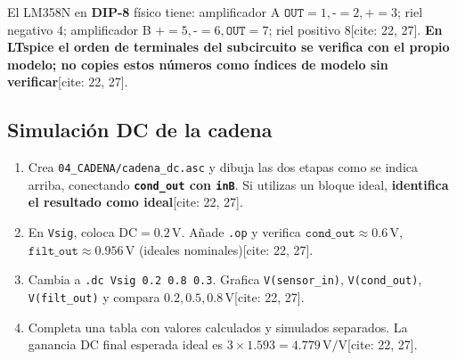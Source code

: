 \documentclass[10pt, a4paper]{article}
\begin{document}
El LM358N en \textbf{DIP-8} físico tiene: amplificador A $\texttt{OUT}=1, \texttt{-}=2, \texttt{+}=3$; riel negativo $4$; amplificador B $\texttt{+}=5, \texttt{-}=6, \texttt{OUT}=7$; riel positivo $8$[cite: 22, 27]. \textbf{En LTspice el orden de terminales del subcircuito se verifica con el propio modelo; no copies estos números como índices de modelo sin verificar}[cite: 22, 27].

\subsection{Simulación DC de la cadena}
\begin{enumerate}[noitemsep, leftmargin=*]
    \item Crea \texttt{04\_CADENA/cadena\_dc.asc} y dibuja las dos etapas como se indica arriba, conectando \textbf{\texttt{cond\_out} con \texttt{inB}}. Si utilizas un bloque ideal, \textbf{identifica el resultado como ideal}[cite: 22, 27].
    \item En \texttt{Vsig}, coloca $\text{DC} = 0.2\,\text{V}$. Añade \texttt{.op} y verifica $\texttt{cond\_out} \approx 0.6\,\text{V}$, $\texttt{filt\_out} \approx 0.956\,\text{V}$ (ideales nominales)[cite: 22, 27].
    \item Cambia a \texttt{.dc Vsig 0.2 0.8 0.3}. Grafica \texttt{V(sensor\_in)}, \texttt{V(cond\_out)}, \texttt{V(filt\_out)} y compara $0.2, 0.5, 0.8\,\text{V}$[cite: 22, 27].
    \item Completa una tabla con valores calculados y simulados separados. La ganancia DC final esperada ideal es $3 \times 1.593 = 4.779\,\text{V/V}$[cite: 22, 27].
\end{enumerate}
\end{document}
